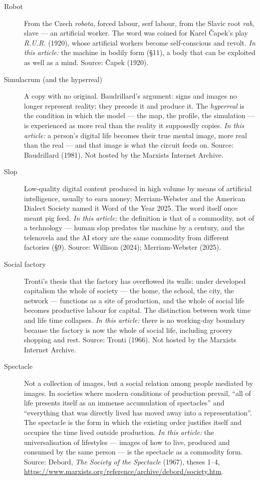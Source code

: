 \documentclass[11pt]{article}
\begin{document}
\begin{description}
\item[Robot] From the Czech \emph{robota}, forced labour, serf labour,
from the Slavic root \emph{rab}, slave --- an artificial worker. The
word was coined for Karel \v{C}apek's play \emph{R.U.R.} (1920), whose
artificial workers become self-conscious and revolt. \emph{In this
article:} the machine in bodily form (§11), a body that can be
exploited as well as a mind. Source: \v{C}apek (1920).

\item[Simulacrum (and the hyperreal)] A copy with no original.
Baudrillard's argument: signs and images no longer represent reality;
they precede it and produce it. The \emph{hyperreal} is the condition
in which the model --- the map, the profile, the simulation --- is
experienced as more real than the reality it supposedly copies.
\emph{In this article:} a person's digital life becomes their true
mental image, more real than the real --- and that image is what the
circuit feeds on. Source: Baudrillard (1981). Not hosted by the
Marxists Internet Archive.

\item[Slop] Low-quality digital content produced in high volume by means
of artificial intelligence, usually to earn money; Merriam-Webster and
the American Dialect Society named it Word of the Year 2025. The word
itself once meant pig feed. \emph{In this article:} the definition is
that of a commodity, not of a technology --- human slop predates the
machine by a century, and the telenovela and the AI story are the same
commodity from different factories (§9). Source: Willison (2024);
Merriam-Webster (2025).

\item[Social factory] Tronti's thesis that the factory has overflowed
its walls: under developed capitalism the whole of society --- the
home, the school, the city, the network --- functions as a site of
production, and the whole of social life becomes productive labour for
capital. The distinction between work time and life time collapses.
\emph{In this article:} there is no working-day boundary because the
factory is now the whole of social life, including grocery shopping
and rest. Source: Tronti (1966). Not hosted by the Marxists Internet
Archive.

\item[Spectacle] Not a collection of images, but a social relation among
people mediated by images. In societies where modern conditions of
production prevail, ``all of life presents itself as an immense
accumulation of spectacles'' and ``everything that was directly lived
has moved away into a representation''. The spectacle is the form in
which the existing order justifies itself and occupies the time lived
outside production. \emph{In this article:} the universalisation of
lifestyles --- images of how to live, produced and consumed by the
same person --- is the spectacle as a commodity form. Source: Debord,
\emph{The Society of the Spectacle} (1967), theses 1--4,
\url{https://www.marxists.org/reference/archive/debord/society.htm}.


\end{description}
\end{document}
